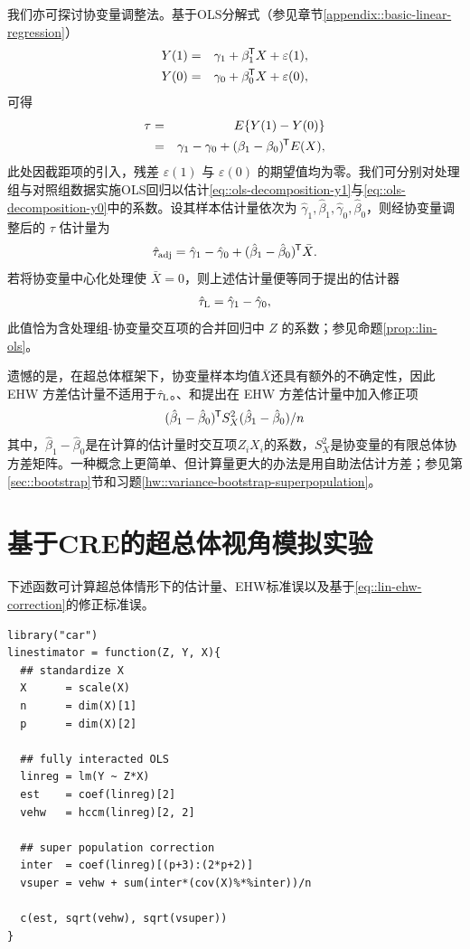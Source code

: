 我们亦可探讨协变量调整法。基于OLS分解式（参见章节\ref{appendix::basic-linear-regression}）
\begin{eqnarray}
Y(1) &=& \gamma_1 + \beta_1^{\mkern-1.5mu\mathsf{T}} X + \varepsilon(1),\label{eq::ols-decomposition-y1}\\
Y(0) &=& \gamma_0 + \beta_0^{\mkern-1.5mu\mathsf{T}} X + \varepsilon(0),\label{eq::ols-decomposition-y0}
\end{eqnarray}
可得
\begin{eqnarray*}
\tau  &=& E\{  Y(1)  - Y(0)\} \\
&=& \gamma_1  -  \gamma_0 + (\beta_1 - \beta_0)^{\mkern-1.5mu\mathsf{T}} E(X),
\end{eqnarray*}
此处因截距项的引入，残差 $  \varepsilon(1)$ 与 $\varepsilon(0)$ 的期望值均为零。我们可分别对处理组与对照组数据实施OLS回归以估计\eqref{eq::ols-decomposition-y1}与\eqref{eq::ols-decomposition-y0}中的系数。设其样本估计量依次为 $\hat{\gamma}_1, \hat{\beta}_1, \hat{\gamma}_0, \hat{\beta}_0$，则经协变量调整后的 $\tau $ 估计量为
$$
\hat{\tau}_\text{adj} =  \hat \gamma_1  - \hat  \gamma_0 + (\hat \beta_1 - \hat \beta_0)^{\mkern-1.5mu\mathsf{T}} \bar{X}.
$$
若将协变量中心化处理使 $ \bar{X} = 0$，则上述估计量便等同于\citet{lin2013}提出的估计器
$$
\hat{\tau}_\textsc{L} = \hat \gamma_1  - \hat  \gamma_0,
$$
此值恰为含处理组-协变量交互项的合并回归中 $Z$ 的系数；参见命题\ref{prop::lin-ols}。 



遗憾的是，在超总体框架下，协变量样本均值$\bar{X} $还具有额外的不确定性，因此 EHW 方差估计量不适用于$\hat{\tau}_\textsc{L}$。\citet{berk2013covariance}、\citet{negi2020revisiting}和\citet{zhao2020caFRT}提出在 EHW 方差估计量中加入修正项
\begin{equation}\label{eq::lin-ehw-correction}
(\hat \beta_1 - \hat \beta_0)^{\mkern-1.5mu\mathsf{T}} S_X^2  (\hat \beta_1 - \hat \beta_0)  / n
\end{equation}
其中，$\hat \beta_1 - \hat \beta_0$是在计算\citet{lin2013}的估计量时交互项$Z_iX_i$的系数，$S_X^2$是协变量的有限总体协方差矩阵。一种概念上更简单、但计算量更大的办法是用自助法估计方差；参见第\ref{sec::bootstrap}节和习题\ref{hw::variance-bootstrap-superpopulation}。 



\section{基于CRE的超总体视角模拟实验}
\label{sec::simulation-CRE-superp}


下述函数可计算超总体情形下的\citet{lin2013}估计量、EHW标准误以及基于\eqref{eq::lin-ehw-correction}的修正标准误。 
\begin{lstlisting}
library("car")
linestimator = function(Z, Y, X){
  ## standardize X
  X      = scale(X)
  n      = dim(X)[1]
  p      = dim(X)[2]
  
  ## fully interacted OLS
  linreg = lm(Y ~ Z*X)
  est    = coef(linreg)[2]
  vehw   = hccm(linreg)[2, 2]
  
  ## super population correction
  inter  = coef(linreg)[(p+3):(2*p+2)]
  vsuper = vehw + sum(inter*(cov(X)%*%inter))/n
  
  c(est, sqrt(vehw), sqrt(vsuper))
}
\end{lstlisting}


